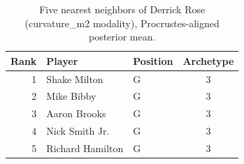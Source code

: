 \begin{table}[htbp]
  \centering\small
  \begin{tabular}{rllc}
    \toprule
    Rank & Player & Position & Archetype \\
    \midrule
    1 & Shake Milton & G & 3 \\
    2 & Mike Bibby & G & 3 \\
    3 & Aaron Brooks & G & 3 \\
    4 & Nick Smith Jr. & G & 3 \\
    5 & Richard Hamilton & G & 3 \\
    \bottomrule
  \end{tabular}
  \caption{Five nearest neighbors of Derrick Rose (curvature_m2 modality), Procrustes-aligned posterior mean.}
  \label{tab:Derrick_Rose_neighbors_curvature_m2}
\end{table}


